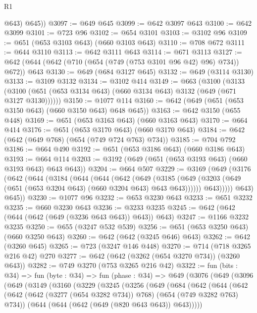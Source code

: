 \begin{lexlean}{R1}
\begin{coremodule}
          @643)
        @645))
@3097 := @649 @645
@3099 := @642 @3097 @643
@3100 := @642 @3099
@3101 := @723 @96
@3102 := @654 @3101
@3103 := @3102 @96
@3109 := @651 (@653 @3103 @643) (@660 @3103 @643)
@3110 := @708 @672
@3111 := @644 @3110
@3113 := @642 @3111 @643
@3114 := @671 @3113
@3127 := @642 (@644 (@642 (@710 (@654 (@749 (@753 @3101 @96 @42) @96) @734)) @672)) @643
@3130 := @649 (@684 @3127 @645)
@3132 := @649 (@3114 @3130)
@3133 := @3109 @3132
@3134 := @3102 @414
@3149 := @663
    (@3100
      (@3133 (@3100 (@651 (@653 @3134 @643) (@660 @3134 @643) @3132 (@649 (@671 @3127 @3130))))))
@3150 := @1077 @114
@3160 := @642 (@649 (@651 (@653 @3150 @643) (@660 @3150 @643) @648 @645))
@3163 := @642 @3150 (@655 @448)
@3169 := @651 (@653 @3163 @643) (@660 @3163 @643)
@3170 := @664 @414
@3176 := @651 (@653 @3170 @643) (@660 @3170 @643)
@3184 := @642 (@642 (@649 @768) (@654 (@749 @724 @763) @734))
@3185 := @704 @792
@3186 := @664 @490
@3192 := @651 (@653 @3186 @643) (@660 @3186 @643)
@3193 := @664 @114
@3203 := @3192 (@649 (@651 (@653 @3193 @643) (@660 @3193 @643) @643 @643))
@3204 := @664 @507
@3229 := @3169
    (@649
      (@3176
        (@642
          (@644
            (@3184
              (@644
                (@644
                  (@642
                    (@649
                      (@3185
                        (@649 (@3203 (@649 (@651 (@653 @3204 @643) (@660 @3204 @643) @643 @643))))))
                    @643)))))
          @643)
        @645))
@3230 := @1077 @96
@3232 := @653 @3230 @643
@3233 := @651 @3232
@3235 := @660 @3230 @643
@3236 := @3233 @3235
@3245 := @642 (@642 (@644 (@642 (@649 (@3236 @643 @643)) @643)) @643)
@3247 := @1166 @3232 @3235
@3250 := @655 (@3247 @532 @539)
@3256 := @651 (@653 @3250 @643) (@660 @3250 @643)
@3260 := @642 (@642 (@3245 @646) @643)
@3262 := @642 (@3260 @645)
@3265 := @723 (@3247 @146 @448)
@3270 := @714 (@718 @3265 @216 @42) @270
@3277 := @642 (@642 (@3262 (@654 @3270 @734)) (@3260 @643))
@3282 := @749 @3270 (@753 @3265 @216 @42)
@3322 := fun (bits : @34) =>
  fun (byte : @34) =>
  fun (phase : @34) =>
  @649
    (@3076
      (@649
        (@3096
          (@649
            (@3149
              (@3160
                (@3229
                  (@3245
                    (@3256
                      (@649
                        (@684
                          (@642
                            (@644
                              (@642
                                (@642
                                  (@642 (@3277 (@654 @3282 @734)) @768)
                                  (@654 (@749 @3282 @763) @734))
                                (@644 (@644 (@642 (@649 (@820 @643 @643)) @643)))))

\end{coremodule}
\end{lexlean}
